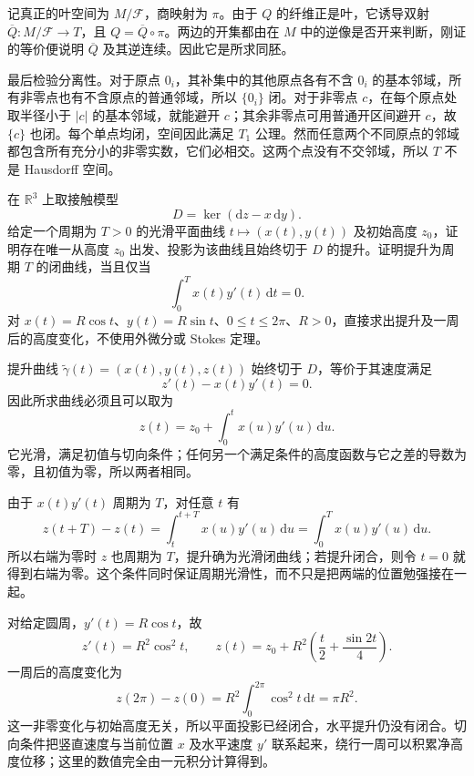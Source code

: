 \begin{solution}
	记真正的叶空间为 \(M/\mathcal F\)，商映射为 \(\pi\)。由于 \(Q\) 的纤维正是叶，它诱导双射 \(\overline Q:M/\mathcal F\to T\)，且 \(Q=\overline Q\circ\pi\)。两边的开集都由在 \(M\) 中的逆像是否开来判断，刚证的等价便说明 \(\overline Q\) 及其逆连续。因此它是所求同胚。

	最后检验分离性。对于原点 \(0_i\)，其补集中的其他原点各有不含 \(0_i\) 的基本邻域，所有非零点也有不含原点的普通邻域，所以 \(\{0_i\}\) 闭。对于非零点 \(c\)，在每个原点处取半径小于 \(|c|\) 的基本邻域，就能避开 \(c\)；其余非零点可用普通开区间避开 \(c\)，故 \(\{c\}\) 也闭。每个单点均闭，空间因此满足 \(T_1\) 公理。然而任意两个不同原点的邻域都包含所有充分小的非零实数，它们必相交。这两个点没有不交邻域，所以 \(T\) 不是 Hausdorff 空间。
\end{solution}

\begin{exercise}
	\label{g1:exr:1305-horizontal-lift}
	在 \(\mathbb R^3\) 上取接触模型
	\[
		D=\ker(\mathrm{d}z-x\,\mathrm{d}y).
	\]
	给定一个周期为 \(T>0\) 的光滑平面曲线 \(t\mapsto(x(t),y(t))\) 及初始高度 \(z_0\)，证明存在唯一从高度 \(z_0\) 出发、投影为该曲线且始终切于 \(D\) 的提升。证明提升为周期 \(T\) 的闭曲线，当且仅当
	\[
		\int_0^T x(t)y'(t)\,\mathrm{d}t=0.
	\]
	对 \(x(t)=R\cos t\)、\(y(t)=R\sin t\)、\(0\le t\le2\pi\)、\(R>0\)，直接求出提升及一周后的高度变化，不使用外微分或 Stokes 定理。
\end{exercise}
\begin{solution}
	提升曲线 \(\widetilde\gamma(t)=(x(t),y(t),z(t))\) 始终切于 \(D\)，等价于其速度满足
	\[
		z'(t)-x(t)y'(t)=0.
	\]
	因此所求曲线必须且可以取为
	\[
		z(t)=z_0+\int_0^t x(u)y'(u)\,\mathrm{d}u.
	\]
	它光滑，满足初值与切向条件；任何另一个满足条件的高度函数与它之差的导数为零，且初值为零，所以两者相同。

	由于 \(x(t)y'(t)\) 周期为 \(T\)，对任意 \(t\) 有
	\[
		z(t+T)-z(t)=\int_t^{t+T}x(u)y'(u)\,\mathrm{d}u
		=\int_0^T x(u)y'(u)\,\mathrm{d}u.
	\]
	所以右端为零时 \(z\) 也周期为 \(T\)，提升确为光滑闭曲线；若提升闭合，则令 \(t=0\) 就得到右端为零。这个条件同时保证周期光滑性，而不只是把两端的位置勉强接在一起。

	对给定圆周，\(y'(t)=R\cos t\)，故
	\[
		z'(t)=R^2\cos^2t,\qquad
		z(t)=z_0+R^2\left(\frac t2+\frac{\sin2t}{4}\right).
	\]
	一周后的高度变化为
	\[
		z(2\pi)-z(0)=R^2\int_0^{2\pi}\cos^2t\,\mathrm{d}t=\pi R^2.
	\]
	这一非零变化与初始高度无关，所以平面投影已经闭合，水平提升仍没有闭合。切向条件把竖直速度与当前位置 \(x\) 及水平速度 \(y'\) 联系起来，绕行一周可以积累净高度位移；这里的数值完全由一元积分计算得到。
\end{solution}

